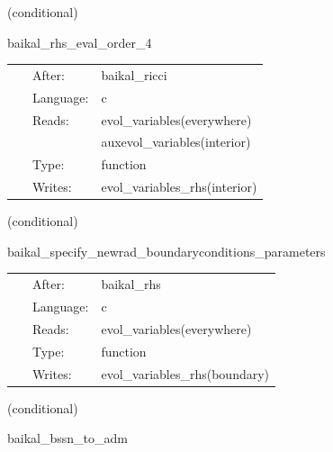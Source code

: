 \vspace{5mm}

   (conditional) 

\hspace{5mm} baikal\_rhs\_eval\_order\_4 

\hspace{5mm}{\it evaluate bssn rhss, at finite-differencing order 4 } 


\hspace{5mm}

 \begin{tabular*}{160mm}{cll} 
~ & After:  & baikal\_ricci \\ 
~ & Language:  & c \\ 
~ & Reads:  & evol\_variables(everywhere) \\ 
~& ~ &auxevol\_variables(interior)\\ 
~ & Type:  & function \\ 
~ & Writes:  & evol\_variables\_rhs(interior) \\ 
\end{tabular*} 


\vspace{5mm}

   (conditional) 

\hspace{5mm} baikal\_specify\_newrad\_boundaryconditions\_parameters 

\hspace{5mm}{\it newrad boundary conditions, scheduled right after rhs eval. } 


\hspace{5mm}

 \begin{tabular*}{160mm}{cll} 
~ & After:  & baikal\_rhs \\ 
~ & Language:  & c \\ 
~ & Reads:  & evol\_variables(everywhere) \\ 
~ & Type:  & function \\ 
~ & Writes:  & evol\_variables\_rhs(boundary) \\ 
\end{tabular*} 


\vspace{5mm}

   (conditional) 

\hspace{5mm} baikal\_bssn\_to\_adm 

